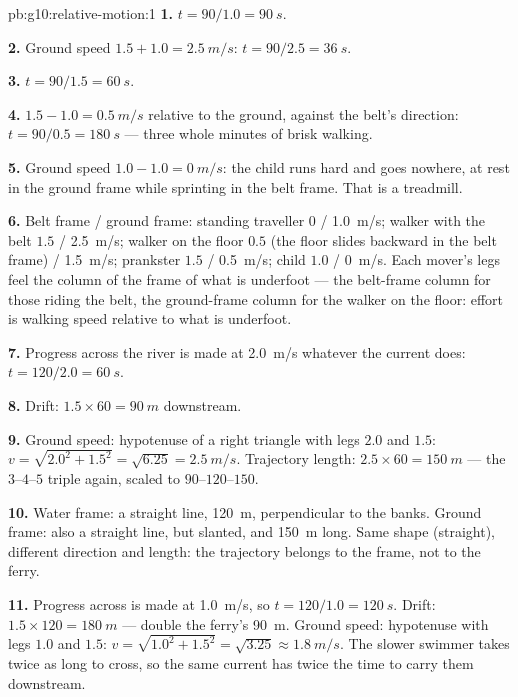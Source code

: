 \begin{solution}{pb:g10:relative-motion:1}
\textbf{1.} $t = 90/1.0 = \qty{90}{s}$.

\textbf{2.} Ground speed $1.5 + 1.0 = \qty{2.5}{m/s}$:
$t = 90/2.5 = \qty{36}{s}$.

\textbf{3.} $t = 90/1.5 = \qty{60}{s}$.

\textbf{4.} $1.5 - 1.0 = \qty{0.5}{m/s}$ relative to the ground,
against the belt's direction: $t = 90/0.5 = \qty{180}{s}$ --- three
whole minutes of brisk walking.

\textbf{5.} Ground speed $1.0 - 1.0 = \qty{0}{m/s}$: the child runs
hard and goes nowhere, at rest in the ground frame while sprinting in
the belt frame. That is a treadmill.

\textbf{6.} Belt frame / ground frame: standing traveller $0$ /
\qty{1.0}{m/s}; walker with the belt $1.5$ / \qty{2.5}{m/s}; walker on
the floor $0.5$ (the floor slides backward in the belt frame) /
\qty{1.5}{m/s}; prankster $1.5$ / \qty{0.5}{m/s}; child $1.0$ /
\qty{0}{m/s}. Each mover's legs feel the column of the frame of what
is underfoot --- the belt-frame column for those riding the belt, the
ground-frame column for the walker on the floor: effort is walking
speed relative to what is underfoot.

\textbf{7.} Progress across the river is made at \qty{2.0}{m/s}
whatever the current does: $t = 120/2.0 = \qty{60}{s}$.

\textbf{8.} Drift: $1.5 \times 60 = \qty{90}{m}$ downstream.

\textbf{9.} Ground speed: hypotenuse of a right triangle with legs
$2.0$ and $1.5$: $v = \sqrt{2.0^2 + 1.5^2} = \sqrt{6.25}
= \qty{2.5}{m/s}$. Trajectory length: $2.5 \times 60 = \qty{150}{m}$
--- the $3$--$4$--$5$ triple again, scaled to $90$--$120$--$150$.

\textbf{10.} Water frame: a straight line, \qty{120}{m}, perpendicular
to the banks. Ground frame: also a straight line, but slanted, and
\qty{150}{m} long. Same shape (straight), different direction and
length: the trajectory belongs to the frame, not to the ferry.

\textbf{11.} Progress across is made at \qty{1.0}{m/s}, so
$t = 120/1.0 = \qty{120}{s}$. Drift: $1.5 \times 120 = \qty{180}{m}$
--- double the ferry's \qty{90}{m}. Ground speed: hypotenuse with legs
$1.0$ and $1.5$: $v = \sqrt{1.0^2 + 1.5^2} = \sqrt{3.25}
\approx \qty{1.8}{m/s}$. The slower swimmer takes twice as long to
cross, so the same current has twice the time to carry them
downstream.


\end{solution}
